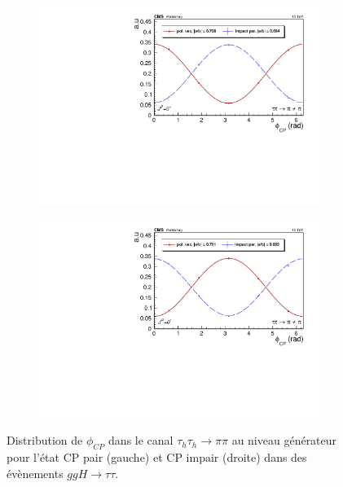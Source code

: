 \begin{figure}[]
  \begin{subfigure}[b]{0.5\linewidth}
    \centering
    \includegraphics[width=\linewidth]{Chapitre6/Images/PIONPION/PIONPION_even_gen.pdf} 
    \caption*{} 
    \vspace{0.5ex}
  \end{subfigure}%
  \begin{subfigure}[b]{0.5\linewidth}
    \centering
    \includegraphics[width=\linewidth]{Chapitre6/Images/PIONPION/PIONPION_odd_gen.pdf} 
    \caption*{} 
    \vspace{0.5ex}
  \end{subfigure} 
  \caption{Distribution de $\phi_{CP}$ dans le canal $\tau_h\tau_h\rightarrow\pi\pi$ au niveau générateur pour l'état CP pair (gauche) et CP impair (droite) dans des évènements $ggH\to\tau\tau$.}
  \label{CPgenPIPI}
\end{figure}


